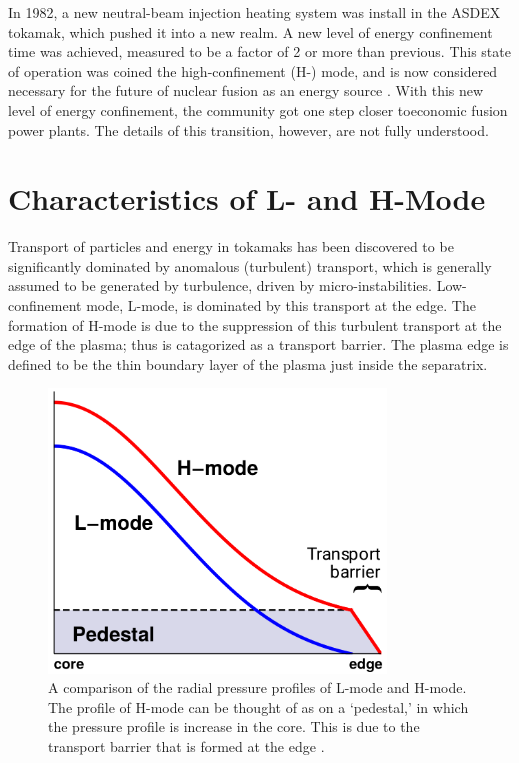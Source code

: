 In 1982, a new neutral-beam injection heating system was install in the ASDEX tokamak, which pushed it into a new realm.
A new level of energy confinement time was achieved, measured to be a factor of 2 or more than previous.
This state of operation was coined the high-confinement (H-) mode, and is now considered necessary for the future of nuclear fusion as an energy source \cite{arnoux_how_2009} \cite{wagner_development_1984}.
With this new level of energy confinement, the community got one step closer toeconomic fusion power plants.
The details of this transition, however, are not fully understood.

\section{Characteristics of L- and H-Mode}
Transport of particles and energy in tokamaks has been discovered to be significantly dominated by anomalous (turbulent) transport, which is generally assumed to be generated by turbulence, driven by micro-instabilities.
Low-confinement mode, L-mode, is dominated by this transport at the edge.
The formation of H-mode is due to the suppression of this turbulent transport at the edge of the plasma; thus is catagorized as a transport barrier.
The plasma edge is defined to be the thin boundary layer of the plasma just inside the separatrix.

\begin{figure}[b]
\begin{minipage}{0.48\linewidth}
	\centering
	\includegraphics[width=0.8\textwidth]{../Graphics/L-mode_H-mode_compare.png}
\end{minipage}
\hfill
\begin{minipage}{0.48\linewidth}
	\caption{A comparison of the radial pressure profiles of L-mode and H-mode.
	The profile of H-mode can be thought of as on a `pedestal,' in which the pressure profile is increase in the core.
	This is due to the transport barrier that is formed at the edge \cite{weymiens_bifurcation_2014}.}
	\label{fig:L-mode_H-mode_compare}
\end{minipage}
\end{figure}


